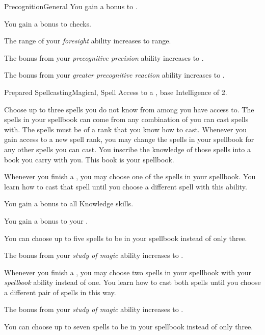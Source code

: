 \begin{feat}{Precognition}{General}
         You gain a  bonus to .

         You gain a  bonus to  checks.

         The range of your \textit{foresight} ability increases to \rnglong range.

         The bonus from your \textit{precognitive precision} ability increases to .

         The bonus from your \textit{greater precognitive reaction} ability increases to .
    \end{feat}

    \begin{feat}{Prepared Spellcasting}{Magical, Spell}
        \featpre Access to a , base Intelligence of 2.

         Choose up to three spells you do not know from among  you have access to.
        The spells in your spellbook can come from any combination of  you can cast spells with.
        The spells must be of a rank that you know how to cast.
        Whenever you gain access to a new spell rank, you may change the spells in your spellbook for any other spells you can cast.
        You inscribe the knowledge of those spells into a book you carry with you.
        This book is your spellbook.
        
        Whenever you finish a , you may choose one of the spells in your spellbook.
        You learn how to cast that spell until you choose a different spell with this ability.

         You gain a  bonus to all Knowledge skills.

         You gain a  bonus to your  .

         You can choose up to five spells to be in your spellbook instead of only three.

         The bonus from your \textit{study of magic} ability increases to .

         Whenever you finish a , you may choose two spells in your spellbook with your \textit{spellbook} ability instead of one.
        You learn how to cast both spells until you choose a different pair of spells in this way.

         The bonus from your \textit{study of magic} ability increases to .

         You can choose up to seven spells to be in your spellbook instead of only three.
    \end{feat}

